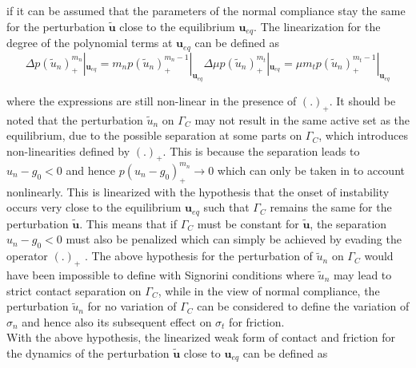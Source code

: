  if it can be assumed that the parameters of the normal compliance stay the same for the perturbation $\bm{\widetilde{u}}$ close to the equilibrium $\bm{u}_{eq}$. The linearization for the degree of the polynomial terms at $\bm{u}_{eq}$ can be defined as\\
 
 \begin{subequations}
 \begin{equation}
  \Delta \mathit{p}(\widetilde{u}_n)^{m_n}_+ |_{\bm{u}_{eq}}
 = m_n \mathit{p}(\widetilde{u}_n)^{m_n-1}_+|_{\bm{u}_{eq}}
 \end{equation}
  \begin{equation}
   \Delta \mu\mathit{p}(\widetilde{u}_n)^{m_t}_+ |_{\bm{u}_{eq}}
   = \mu m_t \mathit{p}(\widetilde{u}_n)^{m_t-1}_+|_{\bm{u}_{eq}}
  \end{equation}
 \end{subequations}
 
where the expressions are still non-linear in the presence of $(.)_+$. It should be noted that the perturbation $\widetilde{u}_n$ on $\Gamma_C$ may not result in the same active set as the equilibrium, due to the possible separation at some parts on $\Gamma_C$, which introduces non-linearities defined by $(.)_+$. 
 This is because the separation leads to $u_n-g_0 < 0$ and hence $p(u_n-g_0)_+^{m_n} \rightarrow 0$ which can only be taken in to account nonlinearly. 
 This is linearized with the hypothesis that the onset of instability occurs very close to the equilibrium $\bm{u}_{eq}$ such that $\Gamma_C$ remains the same for the perturbation $\bm{\widetilde{u}}$. This means that if $\Gamma_C$ must be constant for $\widetilde{\bm{u}}$, the separation $u_n-g_0 < 0$ must also be penalized which can simply be achieved by evading the operator $(.)_+$ .  
The above hypothesis for the perturbation of $\widetilde{u}_n$ on $\Gamma_C$ would have been impossible to define with Signorini conditions where $\widetilde{u}_n$ may lead to strict contact separation on $\Gamma_C$, while in the view of normal compliance, the perturbation $\widetilde{u}_n$ for no variation of $\Gamma_C$ can be considered to  define the variation of $\sigma_n$ and hence also its subsequent effect on $\sigma_t$ for friction.\\
  
With the above hypothesis, the linearized weak form of contact and friction for the dynamics of the perturbation $\bm{\widetilde{u}}$ close to $\bm{u}_{eq}$ can be defined as\\
 

